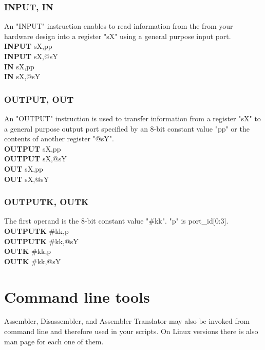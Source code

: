         \subsubsection{INPUT, IN}
            An "INPUT" instruction enables to read information from the from your hardware design into a register "sX" using a general purpose input port.\\
                \textbf{INPUT}      sX,pp\\
                \textbf{INPUT}      sX,@sY\\
                \textbf{IN}         sX,pp\\
                \textbf{IN}         sX,@sY\\
        \subsubsection{OUTPUT, OUT}
            An "OUTPUT" instruction is used to transfer information from a register "sX" to a general purpose output port specified by an 8-bit constant value "pp" or the
            contents of another register "@sY".\\
                \textbf{OUTPUT}     sX,pp\\
                \textbf{OUTPUT}     sX,@sY\\
                \textbf{OUT}        sX,pp\\
                \textbf{OUT}        sX,@sY\\
        \subsubsection{OUTPUTK, OUTK}
            The first operand is the 8-bit constant value "\#kk". "p" is port\_id[0:3].\\
                \textbf{OUTPUTK}     \#kk,p\\
                \textbf{OUTPUTK}     \#kk,@sY\\
                \textbf{OUTK}        \#kk,p\\
                \textbf{OUTK}        \#kk,@sY\\


\section{Command line tools}
    Assembler, Disassembler, and Assembler Translator may also be invoked from command line and therefore used in your scripts.
    On Linux versions there is also man page for each one of them.
